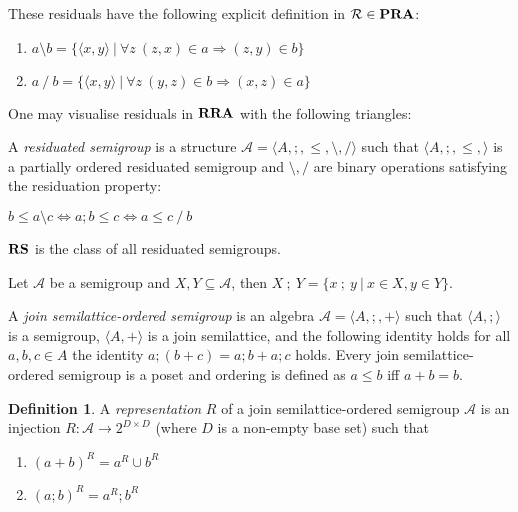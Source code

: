 \documentclass[a4paper]{article}
\theoremstyle{definition}
\newtheorem{definition}{Definition}
\theoremstyle{theorem}
\theoremstyle{proposition}
\theoremstyle{lemma}
\theoremstyle{ex}
\theoremstyle{corollary}
\theoremstyle{claim}
\begin{document}
These residuals have the following explicit definition in $\mathcal{R} \in {\bf PRA}$:
\begin{enumerate}
  \item $a \setminus b = \{ \langle x, y \rangle \: | \: \forall z \: (z, x) \in a \Rightarrow (z, y) \in b \}$
  \item $a \: / \: b = \{ \langle x, y \rangle \: | \: \forall z \: (y, z) \in b \Rightarrow (x, z) \in a \}$
\end{enumerate}

One may visualise residuals in ${\bf RRA}$ with the following triangles:


A \emph{residuated semigroup} is a structure $\mathcal{A} = \langle A, ;, \leq, \setminus, / \rangle$ such that $\langle A, ;, \leq, \rangle$ is a partially ordered residuated semigroup and $\setminus, /$ are binary operations satisfying the residuation property:

  \begin{center}
    $b \leq a \setminus c \Leftrightarrow a ; b \leq c \Leftrightarrow a \leq c \: / \: b$
  \end{center}
  ${\bf RS}$ is the class of all residuated semigroups.

Let $\mathcal{A}$ be a semigroup and $X, Y \subseteq \mathcal{A}$, then $X \: ; \: Y = \{ x \: ; \: y \: | \: x \in X, y \in Y \}$.

A \emph{join semilattice-ordered semigroup} is an algebra $\mathcal{A} = \langle A, ;, + \rangle$ such that $\langle A, ; \rangle$ is a semigroup, $\langle A, + \rangle$ is a join semilattice, and the following identity holds for all $a, b, c \in A$ the identity $a ; (b + c) = a ; b + a ; c$ holds.
Every join semilattice-ordered semigroup is a poset and ordering is defined as $a \leq b$ iff $a + b = b$.

\begin{definition}\label{joinrep}
  A \emph{representation} $R$ of a join semilattice-ordered semigroup $\mathcal{A}$
  is an injection $R : \mathcal{A} \to 2^{D \times D}$ (where $D$ is a non-empty base set) such that
  \begin{enumerate}
    \item $(a + b)^R = a^R \cup b^R$
    \item $(a ; b)^R = a^R ; b^R$
  \end{enumerate}
\end{definition}
\end{document}
